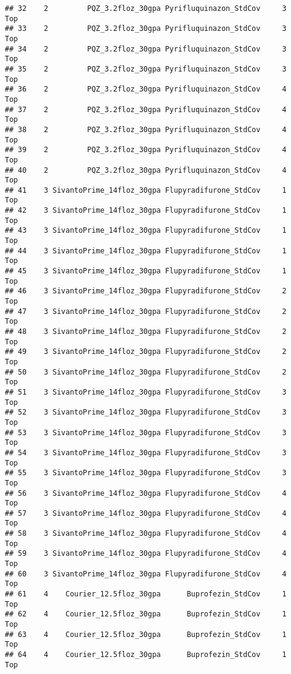 \documentclass[
]{article}
\begin{document}
\begin{verbatim}
## 32    2         PQZ_3.2floz_30gpa Pyrifluquinazon_StdCov     3           Top
## 33    2         PQZ_3.2floz_30gpa Pyrifluquinazon_StdCov     3           Top
## 34    2         PQZ_3.2floz_30gpa Pyrifluquinazon_StdCov     3           Top
## 35    2         PQZ_3.2floz_30gpa Pyrifluquinazon_StdCov     3           Top
## 36    2         PQZ_3.2floz_30gpa Pyrifluquinazon_StdCov     4           Top
## 37    2         PQZ_3.2floz_30gpa Pyrifluquinazon_StdCov     4           Top
## 38    2         PQZ_3.2floz_30gpa Pyrifluquinazon_StdCov     4           Top
## 39    2         PQZ_3.2floz_30gpa Pyrifluquinazon_StdCov     4           Top
## 40    2         PQZ_3.2floz_30gpa Pyrifluquinazon_StdCov     4           Top
## 41    3 SivantoPrime_14floz_30gpa Flupyradifurone_StdCov     1           Top
## 42    3 SivantoPrime_14floz_30gpa Flupyradifurone_StdCov     1           Top
## 43    3 SivantoPrime_14floz_30gpa Flupyradifurone_StdCov     1           Top
## 44    3 SivantoPrime_14floz_30gpa Flupyradifurone_StdCov     1           Top
## 45    3 SivantoPrime_14floz_30gpa Flupyradifurone_StdCov     1           Top
## 46    3 SivantoPrime_14floz_30gpa Flupyradifurone_StdCov     2           Top
## 47    3 SivantoPrime_14floz_30gpa Flupyradifurone_StdCov     2           Top
## 48    3 SivantoPrime_14floz_30gpa Flupyradifurone_StdCov     2           Top
## 49    3 SivantoPrime_14floz_30gpa Flupyradifurone_StdCov     2           Top
## 50    3 SivantoPrime_14floz_30gpa Flupyradifurone_StdCov     2           Top
## 51    3 SivantoPrime_14floz_30gpa Flupyradifurone_StdCov     3           Top
## 52    3 SivantoPrime_14floz_30gpa Flupyradifurone_StdCov     3           Top
## 53    3 SivantoPrime_14floz_30gpa Flupyradifurone_StdCov     3           Top
## 54    3 SivantoPrime_14floz_30gpa Flupyradifurone_StdCov     3           Top
## 55    3 SivantoPrime_14floz_30gpa Flupyradifurone_StdCov     3           Top
## 56    3 SivantoPrime_14floz_30gpa Flupyradifurone_StdCov     4           Top
## 57    3 SivantoPrime_14floz_30gpa Flupyradifurone_StdCov     4           Top
## 58    3 SivantoPrime_14floz_30gpa Flupyradifurone_StdCov     4           Top
## 59    3 SivantoPrime_14floz_30gpa Flupyradifurone_StdCov     4           Top
## 60    3 SivantoPrime_14floz_30gpa Flupyradifurone_StdCov     4           Top
## 61    4    Courier_12.5floz_30gpa      Buprofezin_StdCov     1           Top
## 62    4    Courier_12.5floz_30gpa      Buprofezin_StdCov     1           Top
## 63    4    Courier_12.5floz_30gpa      Buprofezin_StdCov     1           Top
## 64    4    Courier_12.5floz_30gpa      Buprofezin_StdCov     1           Top

\end{verbatim}
\end{document}
